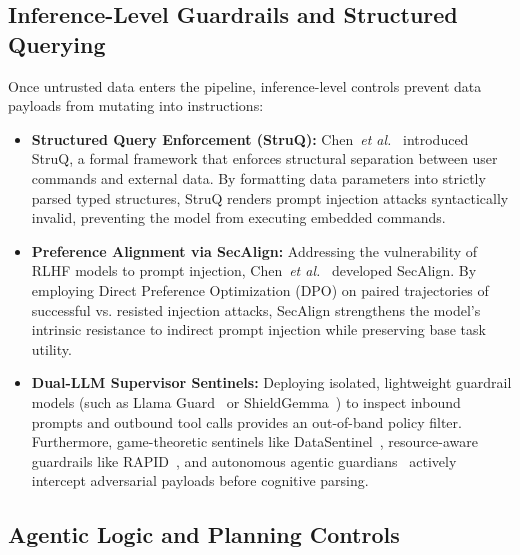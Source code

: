 \subsection{Inference-Level Guardrails and Structured Querying}
\label{subsec:inference_defenses}

Once untrusted data enters the pipeline, inference-level controls prevent data payloads from mutating into instructions:
\begin{itemize}
    \item \textbf{Structured Query Enforcement (StruQ):} Chen~\textit{et al.}~\cite{chen2025struq} introduced StruQ, a formal framework that enforces structural separation between user commands and external data. By formatting data parameters into strictly parsed typed structures, StruQ renders prompt injection attacks syntactically invalid, preventing the model from executing embedded commands.
    \item \textbf{Preference Alignment via SecAlign:} Addressing the vulnerability of RLHF models to prompt injection, Chen~\textit{et al.}~\cite{chen2025secalign} developed SecAlign. By employing Direct Preference Optimization (DPO) on paired trajectories of successful vs. resisted injection attacks, SecAlign strengthens the model's intrinsic resistance to indirect prompt injection while preserving base task utility.
    \item \textbf{Dual-LLM Supervisor Sentinels:} Deploying isolated, lightweight guardrail models (such as Llama Guard~\cite{inan2023llama} or ShieldGemma~\cite{zeng2024shieldgemma}) to inspect inbound prompts and outbound tool calls provides an out-of-band policy filter. Furthermore, game-theoretic sentinels like DataSentinel~\cite{liu2025datasentinel}, resource-aware guardrails like RAPID~\cite{nkoro2026rapid}, and autonomous agentic guardians~\cite{singer2026autonomous} actively intercept adversarial payloads before cognitive parsing.
\end{itemize}

\subsection{Agentic Logic and Planning Controls}
\label{subsec:planning_defenses}

